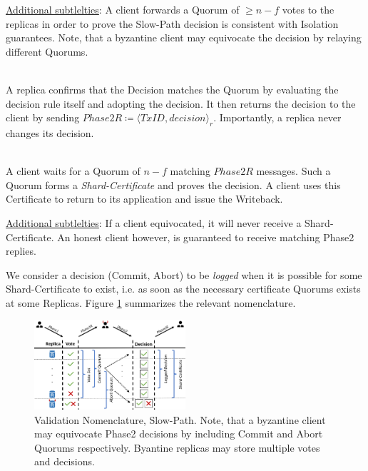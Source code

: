 \underline{Additional subtlelties}: A client forwards a Quorum of $\geq n-f$ votes to the replicas in order to prove the Slow-Path decision is consistent with Isolation guarantees. Note, that a byzantine client may equivocate the decision by relaying different Quorums.

\\
A replica confirms that the Decision matches the Quorum by evaluating the decision rule itself and adopting the decision. It then returns the decision to the client by sending $Phase2R \coloneqq \langle TxID, decision \rangle_r$. Importantly, a replica never changes its decision.

\\
A client waits for a Quorum of $n-f$ matching $Phase2R$ messages. Such a Quorum forms a \textit{Shard-Certificate} and proves the decision. A client uses this Certificate to return to its application and issue the Writeback.

\underline{Additional subtlelties}: If a client equivocated, it will never receive a Shard-Certificate. An honest client however, is guaranteed to receive matching Phase2 replies. 

We consider a decision (Commit, Abort) to be \textit{logged} when it is possible for some Shard-Certificate to exist, i.e. as soon as the necessary certificate Quorums exists at some Replicas.
Figure \ref{fig:FigureSP} summarizes the relevant nomenclature.

\begin{figure}
\begin{center}
\includegraphics[width= 0.5\textwidth]{./figures/Nom2.png}
\end{center}
\caption{Validation Nomenclature, Slow-Path. Note, that a byzantine client may equivocate Phase2 decisions by including Commit and Abort Quorums respectively. Byantine replicas may store multiple votes and decisions.}
\label{fig:FigureSP}
\end{figure}

